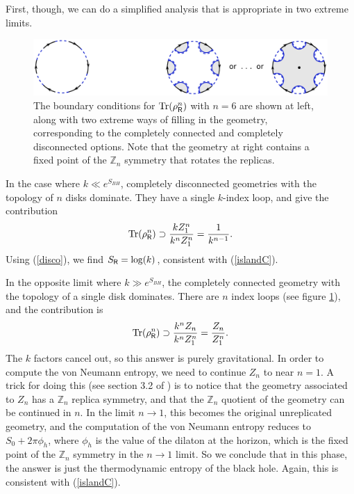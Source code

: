 \documentclass[12pt]{article}
\newcommand{\be}{\begin{equation}}
\newcommand{\ee}{\end{equation}}
\numberwithin{equation}{section}
\def\tr{\text{Tr}}
\begin{document}
First, though, we can do a simplified analysis that is appropriate in two extreme limits.
\begin{figure}[t]
\begin{center}
\includegraphics[scale = .7]{images/1g.pdf}
\caption{{\small The boundary conditions for $\tr(\rho_{\sf{R}}^n)$ with $n = 6$ are shown at left, along with two extreme ways of filling in the geometry, corresponding to the completely connected and completely disconnected options. Note that the geometry at right contains a fixed point of the $\mathbb{Z}_n$ symmetry that rotates the replicas.}}\label{fig1g}
\end{center}
\end{figure}
In the case where $k \ll e^{S_{BH}}$, completely disconnected geometries with the topology of $n$ disks dominate. They have a single $k$-index loop, and give the contribution
\be
\tr(\rho_{\sf{R}}^n) \supset \frac{k Z_1^n}{k^n Z_1^n} = \frac{1}{k^{n-1}}.\label{disco}
\ee
Using (\ref{disco}), we find $S_{\sf{R}}= \log(k)$, consistent with (\ref{islandC}). %

In the opposite limit where $k \gg e^{S_{BH}}$, the completely connected geometry with the topology of a single disk dominates. There are $n$ index loops (see figure \ref{fig1g}), and the contribution is
\be
\tr(\rho_{\sf{R}}^n) \supset \frac{k^n Z_n}{k^n Z_1^n} = \frac{Z_n}{Z_1^n}.
\ee
The $k$ factors cancel out, so this answer is purely gravitational. In order to compute the von Neumann entropy, we need to continue $Z_n$ to near $n = 1$. A trick for doing this (see section 3.2 of \cite{Lewkowycz:2013nqa}) is to notice that the geometry associated to $Z_n$ has a $\mathbb{Z}_n$ replica symmetry, and that the $\mathbb{Z}_n$ quotient of the geometry can be continued in $n$. In the limit $n\rightarrow 1$, this becomes the original unreplicated geometry, and the computation of the von Neumann entropy reduces to $S_0 + 2\pi \phi_h$, where $\phi_h$ is the value of the dilaton at the horizon, which is the fixed point of the $\mathbb{Z}_n$ symmetry in the $n\rightarrow 1$ limit. So we conclude that in this phase, the answer is just the thermodynamic entropy of the black hole. Again, this is consistent with (\ref{islandC}).
\end{document}

